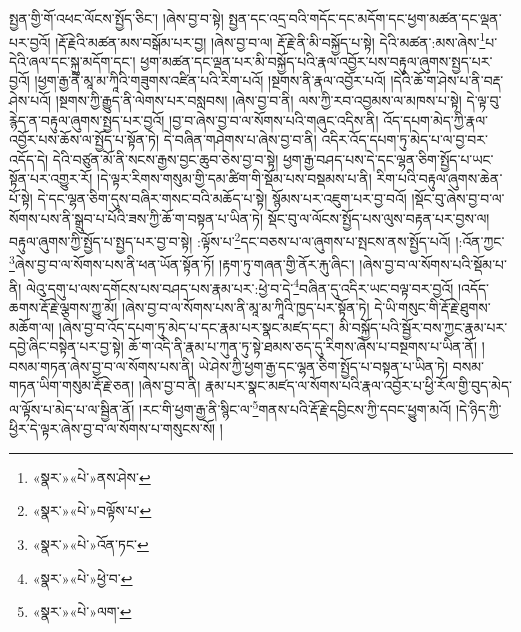 སྤྱན་གྱི་གོ་འཕང་ལོངས་སྤྱོད་ཅིང་། །ཞེས་བྱ་བ་སྟེ། སྤྱན་དང་འདྲ་བའི་གདོང་དང་མདོག་དང་ཕྱག་མཚན་དང་ལྡན་པར་བྱའོ། །རྡོ་རྗེའི་མཚན་མས་བསྒོམ་པར་བྱ། །ཞེས་བྱ་བ་ལ། རྡོ་རྗེ་ནི་མི་བསྐྱོད་པ་སྟེ། དེའི་མཚན་:མས་ཞེས་\footnote{«སྣར་»«པེ་»ནས་ཤེས་}པ་དེའི་ཞལ་དང་སྐུ་མདོག་དང་། ཕྱག་མཚན་དང་ལྡན་པར་མི་བསྐྱོད་པའི་རྣལ་འབྱོར་པས་བརྟུལ་ཞུགས་སྤྱད་པར་བྱའོ། །ཕྱག་རྒྱ་ནི་མཱ་མ་ཀཱིའི་གཟུགས་འཛིན་པའི་རིག་པའོ། །སྔགས་ནི་རྣལ་འབྱོར་པའོ། །དེའི་ཆོ་ག་ཤེས་པ་ནི་བརྡ་ཤེས་པའོ། །སྔགས་ཀྱི་རྒྱུད་ནི་ལེགས་པར་བསླབས། །ཞེས་བྱ་བ་ནི། ལས་ཀྱི་རབ་འབྱམས་ལ་མཁས་པ་སྟེ། དེ་ལྟ་བུ་རྙེད་ན་བརྟུལ་ཞུགས་སྤྱད་པར་བྱའོ། །བྱ་བ་ཞེས་བྱ་བ་ལ་སོགས་པའི་གཞུང་འདིས་ནི། འོད་དཔག་མེད་ཀྱི་རྣལ་འབྱོར་པས་ཆོས་ལ་སྤྱོད་པ་སྟོན་ཏེ། དེ་བཞིན་གཤེགས་པ་ཞེས་བྱ་བ་ནི། འདིར་འོད་དཔག་ཏུ་མེད་པ་ལ་བྱ་བར་འདོད་དེ། དེའི་བཙུན་མོ་ནི་སངས་རྒྱས་བྱང་ཆུབ་ཅེས་བྱ་བ་སྟེ། ཕྱག་རྒྱ་བཤད་པས་དེ་དང་ལྷན་ཅིག་སྤྱོད་པ་ཡང་སྟོན་པར་འགྱུར་རོ། །དེ་ལྟར་རིགས་གསུམ་གྱི་དམ་ཚིག་གི་སྡོམ་པས་བསྡམས་པ་ནི། རིག་པའི་བརྟུལ་ཞུགས་ཆེན་པོ་སྟེ། དེ་དང་ལྷན་ཅིག་དུས་བཞིར་གསང་བའི་མཆོད་པ་སྟེ། སྙོམས་པར་འཇུག་པར་བྱ་བའོ། །སྡོང་བུ་ཞེས་བྱ་བ་ལ་སོགས་པས་ནི་སྒྲུབ་པ་པོའི་ཟས་ཀྱི་ཆོ་ག་བསྟན་པ་ཡིན་ཏེ། སྡོང་བུ་ལ་ལོངས་སྤྱོད་པས་ལུས་བརྟན་པར་བྱས་ལ། བརྟུལ་ཞུགས་ཀྱི་སྤྱོད་པ་སྤྱད་པར་བྱ་བ་སྟེ། :ལྟོས་པ་\footnote{«སྣར་»«པེ་»བལྟོས་པ་}དང་བཅས་པ་ལ་ཞུགས་པ་སྤངས་ནས་སྤྱོད་པའོ། །:འོན་ཀྱང་\footnote{«སྣར་»«པེ་»འོན་ཏང་}ཞེས་བྱ་བ་ལ་སོགས་པས་ནི་ཕན་ཡོན་སྟོན་ཏོ། །རྟག་ཏུ་གཞན་གྱི་ནོར་རྐུ་ཞིང་། །ཞེས་བྱ་བ་ལ་སོགས་པའི་སྡོམ་པ་ནི། ལེའུ་དགུ་པ་ལས་དགོངས་པས་བཤད་པས་རྣམ་པར་:ཕྱེ་བ་དེ་\footnote{«སྣར་»«པེ་»ཕྱེ་བ་}བཞིན་དུ་འདིར་ཡང་བལྟ་བར་བྱའོ། །འདོད་ཆགས་རྡོ་རྗེ་ལྕགས་ཀྱུ་མོ། །ཞེས་བྱ་བ་ལ་སོགས་པས་ནི་མཱ་མ་ཀཱིའི་ཁྱད་པར་སྟོན་ཏེ། དེ་ཡི་གསུང་གི་རྡོ་རྗེ་ཐུགས་མཆོག་ལ། །ཞེས་བྱ་བ་འོད་དཔག་ཏུ་མེད་པ་དང་རྣམ་པར་སྣང་མཛད་དང་། མི་བསྐྱོད་པའི་སྦྱོར་བས་ཀྱང་རྣམ་པར་དབྱེ་ཞིང་བསྟེན་པར་བྱ་སྟེ། ཆོ་ག་འདི་ནི་རྣམ་པ་ཀུན་ཏུ་སྟེ་ཐམས་ཅད་དུ་རིགས་ཞེས་པ་བསྔགས་པ་ཡིན་ནོ། །བསམ་གཏན་ཞེས་བྱ་བ་ལ་སོགས་པས་ནི། ཡེ་ཤེས་ཀྱི་ཕྱག་རྒྱ་དང་ལྷན་ཅིག་སྤྱོད་པ་བསྟན་པ་ཡིན་ཏེ། བསམ་གཏན་ཡིག་གསུམ་རྡོ་རྗེ་ཅན། །ཞེས་བྱ་བ་ནི། རྣམ་པར་སྣང་མཛད་ལ་སོགས་པའི་རྣལ་འབྱོར་པ་ཕྱི་རོལ་གྱི་བུད་མེད་ལ་ལྟོས་པ་མེད་པ་ལ་སྦྱིན་ནོ། །རང་གི་ཕྱག་རྒྱ་ནི་སྙིང་ལ་\footnote{«སྣར་»«པེ་»ལག་}གནས་པའི་རྡོ་རྗེ་དབྱིངས་ཀྱི་དབང་ཕྱུག་མའོ། །དེ་ཉིད་ཀྱི་ཕྱིར་དེ་ལྟར་ཞེས་བྱ་བ་ལ་སོགས་པ་གསུངས་སོ། །
